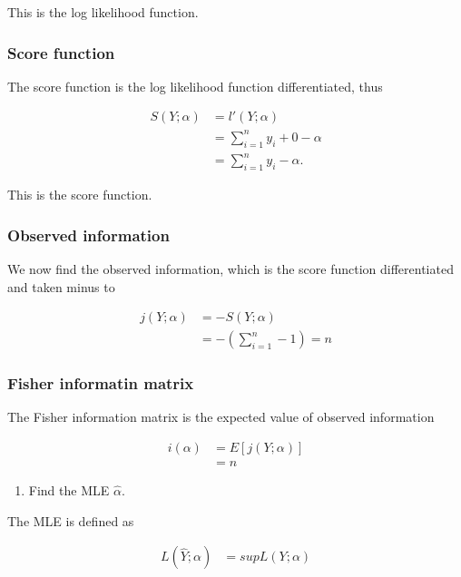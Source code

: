This is the log likelihood function. 

\subsubsection{Score function}

The score function is the log likelihood function differentiated, thus

\begin{align*}
    S\left( Y; \alpha \right) &= l'(Y; \alpha)\\
    &= \sum_{i=1}^n y_i + 0 - \alpha\\
    &= \sum_{i=1}^n y_i - \alpha.
\end{align*}

This is the score function. 

\subsubsection{Observed information}

We now find the observed information, which is the score function differentiated and taken minus to

\begin{align*}
    j\left( Y; \alpha \right) &= - S\left(Y; \alpha \right)\\
    &=  - \left( \sum_{i = 1}^n -1\right) = n
\end{align*}

\subsubsection{Fisher informatin matrix}

The Fisher information matrix is the expected value of observed information

\begin{align*}
    i\left(\alpha \right) &= E\left[j(Y;\alpha)\right]\\
    &= n
\end{align*}

\begin{enumerate}[resume]
    \item  Find the MLE $\hat{\alpha}$.
\end{enumerate}

The MLE is defined as

\begin{align*}
    L(\hat{Y}; \alpha) &= sup L(Y; \alpha)
\end{align*}

